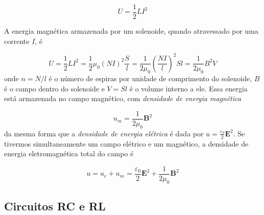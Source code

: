 \documentclass{article}
\begin{document}
\begin{equation}
    \boxed{U = \frac{1}{2} L I^2}
\end{equation}

A energia magnética armazenada por um solenoide, quando atravessado por uma corrente \(I\), é

\begin{equation}
    U = \frac{1}{2} L I^2 = \frac{1}{2}\mu_0 \left(NI\right)^2 \frac{S}{l} = \frac{1}{2\mu_0} \left(\frac{NI}{l}\right)^2 Sl = \frac{1}{2\mu_0} B^2 V
\end{equation} onde \(n = N/l\) é o número de espiras por unidade de comprimento do solenoide, \(B\) é o campo dentro do solenoide e \(V = Sl\) é o volume interno a ele. Essa energia está armazenada no campo magnético, com \emph{densidade de energia magnética}

\begin{equation}
    \boxed{u_m = \frac{1}{2\mu_0}\mathbf{B}^2}
\end{equation} da mesma forma que a \emph{densidade de energia elétrica} é dada por \(\displaystyle u = \frac{\varepsilon_0}{2}\mathbf{E}^2\). Se tivermos simultaneamente um campo elétrico e um magnético, a densidade de energia eletromagnética total do campo é

\begin{equation}
    \boxed{u = u_e + u_m = \frac{\varepsilon_0}{2}\mathbf{E}^2 + \frac{1}{2\mu_0} \mathbf{B}^2}
\end{equation}

\subsection{Circuitos RC e RL}
\end{document}
